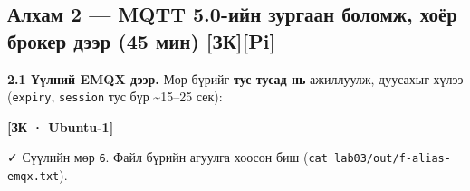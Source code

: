 \hypertarget{ux430ux43bux445ux430ux43c-2-mqtt-5.0-ux438ux439ux43d-ux437ux443ux440ux433ux430ux430ux43d-ux431ux43eux43bux43eux43cux436-ux445ux43eux451ux440-ux431ux440ux43eux43aux435ux440-ux434ux44dux44dux440-45-ux43cux438ux43d-ux437ux43api}{%
\subsection{Алхам 2 --- MQTT 5.0-ийн зургаан боломж, хоёр брокер дээр (45 мин) {[}ЗК{]}{[}Pi{]}}\label{ux430ux43bux445ux430ux43c-2-mqtt-5.0-ux438ux439ux43d-ux437ux443ux440ux433ux430ux430ux43d-ux431ux43eux43bux43eux43cux436-ux445ux43eux451ux440-ux431ux440ux43eux43aux435ux440-ux434ux44dux44dux440-45-ux43cux438ux43d-ux437ux43api}}

\textbf{2.1 Үүлний EMQX дээр.} Мөр бүрийг \textbf{тус тусад нь} ажиллуулж, дуусахыг хүлээ (\texttt{expiry}, \texttt{session} тус бүр \textasciitilde15--25 сек):

\textbf{{[}ЗК · Ubuntu-1{]}}

\begin{Shaded}
\begin{Highlighting}[]
\KeywordTok{|} 
\KeywordTok{|} 
\KeywordTok{|} 
\KeywordTok{|} 
\KeywordTok{|} 
\KeywordTok{|} 
\KeywordTok{|} 
\end{Highlighting}
\end{Shaded}

✓ Сүүлийн мөр \texttt{6}. Файл бүрийн агуулга хоосон биш (\texttt{cat\ lab03/\allowbreak{}out/\allowbreak{}f-alias-emqx.\allowbreak{}txt}).

